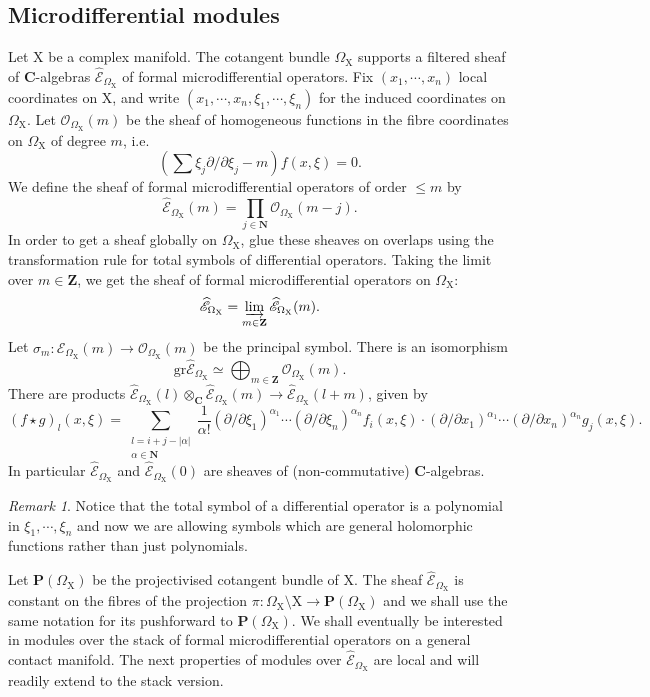 \documentclass{article}
\theoremstyle{plain}
\theoremstyle{definition}
\theoremstyle{remark}
\newtheorem{remark}[theorem]{Remark}
\newcommand{\Em}{\widehat{\mathscr{E}}_{\Omega_\mr{X}}}
\newcommand{\mr}{\mathrm}
\newcommand{\Z}{\mathbf Z}
\newcommand{\C}{\mathbf C}
\newcommand{\3}{\vspace{3mm}}
\newcommand{\2}{\vspace{2mm}}
\newcommand{\1}{\vspace{1mm}}
\begin{document}
\subsection{Microdifferential modules}
Let $\mr{X}$ be a complex manifold. The cotangent bundle $\Omega_\mr{X}$ supports a filtered sheaf of $\C$-algebras $\widehat{\mathscr{E}}_{\Omega_\mr{X}}$ of formal microdifferential operators. Fix $(x_1,\cdots,x_n)$ local coordinates on $\mr{X}$, and write $(x_1,\cdots,x_n,\xi_1,\cdots,\xi_n)$ for the induced coordinates on $\Omega_\mr{X}$. Let $\mathscr{O}_{\Omega_\mr{X}}(m)$ be the sheaf of homogeneous functions in the fibre coordinates on $\Omega_\mr{X}$ of degree $m$, i.e. $$\left(\sum \xi_j\partial/\partial\xi_j - m\right)f(x,\xi)=0.$$
 We define the sheaf of formal microdifferential operators of order $\le m$ by $$\widehat{\mathscr{E}}_{\Omega_\mr{X}}(m) = \prod_{j \in \mathbf{N}} \mathscr{O}_{\Omega_\mr{X}}(m-j).$$ In order to get a sheaf globally on $\Omega_\mr{X}$, glue these sheaves on overlaps using the transformation rule for total symbols of differential operators. Taking the limit over $m \in \mathbf{Z}$, we get the sheaf of formal microdifferential operators on $\Omega_\mr{X}$: $$\widehat{\mathscr{E}}_{\Omega_\mr{X}} = \varinjlim_{m \in \mathbf{Z}}\widehat{\mathscr{E}}_{\Omega_\mr{X}}(m).$$
Let $\sigma_m: \widehat{\mathscr{E}}_{\Omega_\mr{X}}(m) \to \mathscr{O}_{\Omega_\mr{X}}(m)$ be the principal symbol. There is an isomorphism $$\mr{gr}\widehat{\mathscr{E}}_{\Omega_\mr{X}}\simeq \bigoplus_{m\in \Z}\mathscr{O}_{\Omega_\mr{X}}(m).$$
There are products $\widehat{\mathscr{E}}_{\Omega_\mr{X}}(l)\otimes_{\C}\widehat{\mathscr{E}}_{\Omega_\mr{X}}(m) \to \widehat{\mathscr{E}}_{\Omega_\mr{X}}(l+m)$, given by $$(f\star g)_{l}(x,\xi) = \sum_{\substack{l=i+j-|\alpha|\\ \alpha \in \mathbf{N}}}\frac{1}{\alpha!}(\partial/\partial\xi_1)^{\alpha_1}\cdots (\partial/\partial\xi_n)^{\alpha_n}f_i(x,\xi)\cdot (\partial/\partial x_1)^{\alpha_1}\cdots (\partial/\partial x_n)^{\alpha_n}g_j(x,\xi).$$ In particular $\widehat{\mathscr{E}}_{\Omega_\mr{X}}$ and $\widehat{\mathscr{E}}_{\Omega_\mr{X}}(0)$ are sheaves of (non-commutative) $\C$-algebras. 
 \2
 \begin{remark}
 Notice that the total symbol of a differential operator is a polynomial in $\xi_1,\cdots, \xi_n$ and now we are allowing symbols which are general holomorphic functions rather than just polynomials.
 \end{remark}
 Let $\mr{\mathbf{P}}(\Omega_\mr{X})$ be the projectivised cotangent bundle of $\mr{X}$. The sheaf $\widehat{\mathscr{E}}_{\Omega_\mr{X}}$ is constant on the fibres of the projection $\pi:\Omega_\mr{X}\setminus \mr{X} \to \mr{\mathbf{P}}(\Omega_\mr{X})$ and we shall use the same notation for its pushforward to $\mr{\mathbf{P}}(\Omega_\mr{X})$. We shall eventually be interested in modules over the stack of formal microdifferential operators on a general contact manifold. The next properties of modules over $\Em$ are local and will readily extend to the stack version. \\
\end{document}
